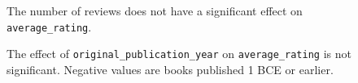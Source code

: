 \documentclass[11pt]{article}
\begin{document}
    

\begin{figure}
    \begin{center}
    \end{center}
\caption[Average Rating by Reviews Count]{The number of reviews does not have a significant effect on
\texttt{average\_rating}.}
     \label{fig:average-rating-reviews-count}
\end{figure}


\begin{figure}
    \begin{center}
    \end{center}
    \caption[Average Rating by Publication Year]{The effect of \texttt{original\_publication\_year} on
\texttt{average\_rating} is not significant. Negative values are
books published 1 BCE or earlier.}
     \label{fig:average-rating-reviews-count}
\end{figure}
    
%    




\end{document}
